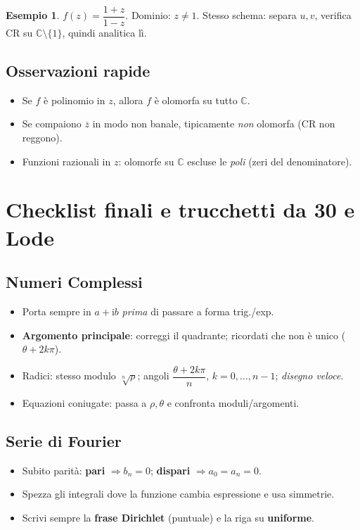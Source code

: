 \documentclass[11pt,a4paper]{article}
\newcommand{\C}{\mathbb{C}}
\newcommand{\ii}{\mathrm{i}}
\theoremstyle{definition}
\newtheorem{example}{Esempio}
\begin{document}
\begin{example}
$f(z)=\dfrac{1+z}{1-z}$. \;
Dominio: $z\neq 1$. 
Stesso schema: separa $u,v$, verifica CR su $\C\setminus\{1\}$, quindi analitica lì.
\end{example}

\subsection{Osservazioni rapide}
\begin{itemize}
\item Se $f$ è polinomio in $z$, allora $f$ è olomorfa su tutto $\C$.
\item Se compaiono $\overline{z}$ in modo non banale, tipicamente \emph{non} olomorfa (CR non reggono).
\item Funzioni razionali in $z$: olomorfe su $\C$ escluse le \emph{poli} (zeri del denominatore).
\end{itemize}

\section{Checklist finali e trucchetti da 30 e Lode}

\subsection*{Numeri Complessi}
\begin{itemize}
\item Porta sempre in $a+\ii b$ \emph{prima} di passare a forma trig./exp.
\item \textbf{Argomento principale}: correggi il quadrante; ricordati che non è unico ($\theta+2k\pi$).
\item Radici: stesso modulo $\sqrt[n]{\rho}$; angoli $\dfrac{\theta+2k\pi}{n}$, $k=0,\dots,n-1$; \emph{disegno veloce}.
\item Equazioni coniugate: passa a $\rho,\theta$ e confronta moduli/argomenti.
\end{itemize}

\subsection*{Serie di Fourier}
\begin{itemize}
\item Subito parità: \textbf{pari} $\Rightarrow b_n=0$;\; \textbf{dispari} $\Rightarrow a_0=a_n=0$.
\item Spezza gli integrali dove la funzione cambia espressione e usa simmetrie.
\item Scrivi sempre la \textbf{frase Dirichlet} (puntuale) e la riga su \textbf{uniforme}.
\end{itemize}
\end{document}
